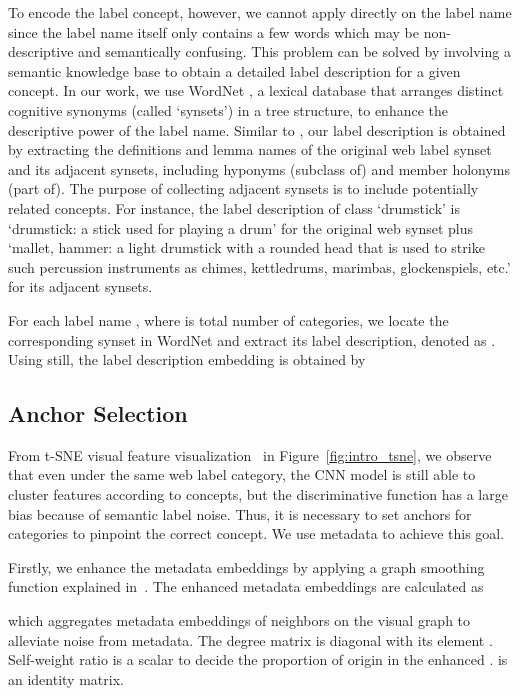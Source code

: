 \documentclass[sigconf]{acmart}
\begin{document}
To encode the label concept, however, we cannot apply  directly on the label name  since the label name itself only contains a few words which may be non-descriptive and semantically confusing. This problem can be solved by involving a semantic knowledge base to obtain a detailed label description for a given concept. In our work, we use WordNet \cite{miller1998wordnet}, a lexical database that arranges distinct cognitive synonyms (called `synsets’) in a tree structure, to enhance the descriptive power of the label name. Similar to \cite{wei2015labeldescription}, our label description is obtained by extracting the definitions and lemma names of the original web label synset and its adjacent synsets, including hyponyms (subclass of) and member holonyms (part of). The purpose of collecting adjacent synsets is to include potentially related concepts. For instance, the label description of class `drumstick' is `drumstick: a stick used for playing a drum' for the original web synset plus `mallet, hammer: a light drumstick with a rounded head that is used to strike such percussion instruments as chimes, kettledrums, marimbas, glockenspiels, etc.' for its adjacent synsets. 

For each label name , where  is total number of categories, we locate the corresponding synset in WordNet and extract its label description, denoted as . Using  still, the label description embedding  is obtained by


\subsection{Anchor Selection}
	\label{S:anchor}
	From t-SNE visual feature visualization~\cite{maaten2008visualizing} in Figure~\ref{fig:intro_tsne}, we observe that even under the same web label category, the CNN model is still able to cluster features according to concepts, but the discriminative function has a large bias because of semantic label noise. Thus, it is necessary to set anchors for categories to pinpoint the correct concept. We use metadata to achieve this goal.
	
	Firstly, we enhance the metadata embeddings  by applying a graph smoothing function explained in~\cite{kipf2016gcn}. The enhanced metadata embeddings  are calculated as
	
	which aggregates metadata embeddings of neighbors on the visual graph to alleviate noise from metadata. The degree matrix  is diagonal with its element . Self-weight ratio  is a scalar to decide the proportion of origin  in the enhanced .  is an identity matrix.
	
\end{document}
